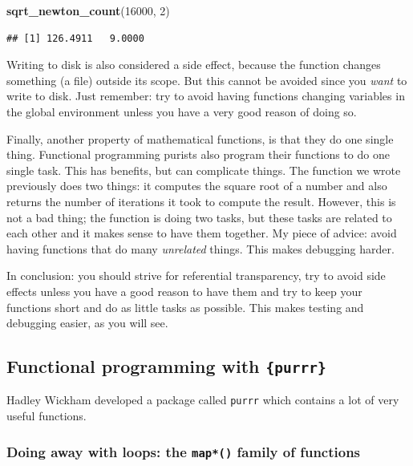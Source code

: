 \documentclass[]{gitbook}
\newenvironment{Shaded}{\begin{snugshade}}{\end{snugshade}}
\newcommand{\DecValTok}[1]{\textcolor[rgb]{0.00,0.00,0.81}{#1}}
\newcommand{\KeywordTok}[1]{\textcolor[rgb]{0.13,0.29,0.53}{\textbf{#1}}}
\newcommand{\NormalTok}[1]{#1}
\begin{document}
\begin{Shaded}
\begin{Highlighting}[]
\KeywordTok{sqrt_newton_count}\NormalTok{(}\DecValTok{16000}\NormalTok{, }\DecValTok{2}\NormalTok{)}
\end{Highlighting}
\end{Shaded}

\begin{verbatim}
## [1] 126.4911   9.0000
\end{verbatim}

Writing to disk is also considered a side effect, because the function changes something (a file)
outside its scope. But this cannot be avoided since you \emph{want} to write to disk.
Just remember: try to avoid having functions changing variables in the global environment unless
you have a very good reason of doing so.

Finally, another property of mathematical functions, is that they do one single thing. Functional
programming purists also program their functions to do one single task. This has benefits, but
can complicate things. The function we wrote previously does two things: it computes the square
root of a number and also returns the number of iterations it took to compute the result. However,
this is not a bad thing; the function is doing two tasks, but these tasks are related to each other
and it makes sense to have them together. My piece of advice: avoid having functions that do
many \emph{unrelated} things. This makes debugging harder.

In conclusion: you should strive for referential transparency, try to avoid side effects unless you
have a good reason to have them and try to keep your functions short and do as little tasks as
possible. This makes testing and debugging easier, as you will see.

\hypertarget{functional-programming-with-purrr}{%
\subsection{\texorpdfstring{Functional programming with \texttt{\{purrr\}}}{Functional programming with \{purrr\}}}\label{functional-programming-with-purrr}}

Hadley Wickham developed a package called \texttt{purrr} which contains a lot of very useful functions.

\hypertarget{doing-away-with-loops-the-map-family-of-functions}{%
\subsubsection{\texorpdfstring{Doing away with loops: the \texttt{map*()} family of functions}{Doing away with loops: the map*() family of functions}}\label{doing-away-with-loops-the-map-family-of-functions}}
\end{document}
